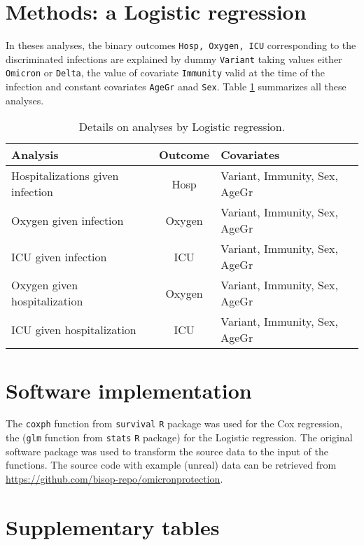\documentclass[9pt,onecolumn,twoside,lineno]{article}
\begin{document}
\section*{Methods: a Logistic regression}

In theses analyses, the binary outcomes {\tt Hosp, Oxygen, ICU} corresponding to the discriminated infections are explained by dummy {\tt Variant} taking values either {\tt Omicron} or {\tt Delta}, the value of covariate {\tt Immunity} valid at the time of the infection and constant covariates {\tt AgeGr} anad {\tt Sex}. Table \ref{tab:lrs} summarizes all these analyses.

\begin{table}
\caption{Details on analyses by Logistic regression. \vspace{1mm}}
\centering
\begin{tabular}{lcl}
\hline
Analysis & Outcome & Covariates \\ 
\hline
Hospitalizations given infection & Hosp & 
Variant, Immunity, Sex, AgeGr \\
Oxygen given infection & Oxygen & 
Variant, Immunity, Sex, AgeGr \\
ICU given infection & ICU & 
Variant, Immunity, Sex, AgeGr \\
Oxygen given hospitalization & Oxygen & 
Variant, Immunity, Sex, AgeGr \\
ICU given hospitalization& ICU & 
Variant, Immunity, Sex, AgeGr \\
\hline
\end{tabular}
\label{tab:lrs}
\end{table}

\section*{Software implementation}

The {\tt coxph} function from {\tt survival} {\tt R} package was used for the Cox regression, the ({\tt glm} function from {\tt stats} {\tt R} package) for the Logistic regression. The original software package was used to transform the source data to the input of the functions. The source code with example (unreal) data can be retrieved from \url{https://github.com/bisop-repo/omicronprotection}.



\section*{Supplementary tables}
\end{document}
